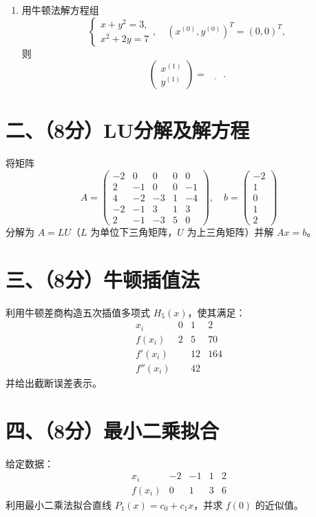 \documentclass[12pt,a4paper]{article}
\newcommand{\blank}[1]{\underline{\hspace{#1}}}
\begin{document}
\begin{enumerate}[leftmargin=*,itemsep=1.5ex]
		\[
		\begin{cases}
			x + f(x,y) = 0,\\
			\ln x - y = 0
		\end{cases}
		\]
		的简单迭代格式为\blank{30pt}，Gauss--Seidel 迭代格式为\blank{30pt}；
		\item 用牛顿法解方程组
		\[
		\begin{cases}
			x + y^2 = 3,\\
			x^2 + 2y = 7
		\end{cases},
		\quad (x^{(0)},y^{(0)})^T=(0,0)^T,
		\]
		则
		\[
		\begin{pmatrix}x^{(1)}\\y^{(1)}\end{pmatrix}
		= \blank{20pt}.
		\]
	\end{enumerate}
	
	\section*{二、（8分）LU分解及解方程}
	将矩阵
	\[
	A=\begin{pmatrix}
		-2&0&0&0&0\\
		2&-1&0&0&-1\\
		4&-2&-3&1&-4\\
		-2&-1&3&1&3\\
		2&-1&-3&5&0
	\end{pmatrix},\quad
	b=\begin{pmatrix}-2\\1\\0\\1\\2\end{pmatrix}
	\]
	分解为 $A=LU$（$L$ 为单位下三角矩阵，$U$ 为上三角矩阵）并解 $Ax=b$。
	
	\section*{三、（8分）牛顿插值法}
	利用牛顿差商构造五次插值多项式 $H_5(x)$，使其满足：
	\[
	\begin{array}{c|ccc}
		x_i & 0 & 1 & 2\\\hline
		f(x_i) & 2 & 5 & 70\\\hline
		f'(x_i)&   &12&164\\\hline
		f''(x_i)&  &42&
	\end{array}
	\]
	并给出截断误差表示。
	
	\section*{四、（8分）最小二乘拟合}
	给定数据：
	\[
	\begin{array}{c|cccc}
		x_i & -2 & -1 & 1 & 2\\\hline
		f(x_i) & 0 & 1 & 3 & 6
	\end{array}
	\]
	利用最小二乘法拟合直线 $P_1(x)=c_0+c_1x$，并求 $f(0)$ 的近似值。
	
\end{document}
